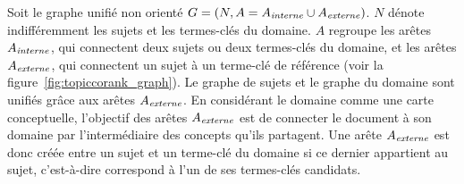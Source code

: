         Soit le graphe unifié non orienté $G = (N, A =
        A_{\textnormal{\textit{interne}}} \cup
        A_{\textnormal{\textit{externe}}})$. $N$ dénote indifféremment les
        sujets et les termes-clés du domaine. $A$ regroupe les arêtes
        $A_{\textnormal{\textit{interne}}}$, qui connectent deux sujets ou deux
        termes-clés du domaine, et les arêtes
        $A_{\textnormal{\textit{externe}}}$, qui connectent un sujet à un
        terme-clé de référence (voir la figure~\ref{fig:topiccorank_graph}). Le
        graphe de sujets et le graphe du domaine sont unifiés grâce aux arêtes
        $A_{\textnormal{\textit{externe}}}$.
        En considérant le domaine comme une carte conceptuelle, l'objectif des
        arêtes $A_{\textnormal{\textit{externe}}}$ est de connecter le document
        à son domaine par l'intermédiaire des concepts qu'ils partagent. Une
        arête $A_{\textnormal{\textit{externe}}}$ est donc créée entre un sujet
        et un terme-clé du domaine si ce dernier appartient au sujet,
        c'est-à-dire correspond à l'un de ses termes-clés candidats.
